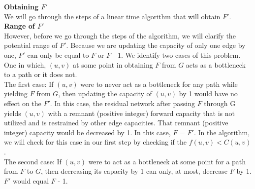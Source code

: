 \documentclass[11pt, solution, letterpaper]{format}
\begin{document}
\textbf{Obtaining $F'$}\\
We will go through the steps of a linear time algorithm that will obtain $F'$. \\

\textbf{Range of $F'$}\\
However, before we go through the steps of the algorithm, we will clarify the potential range of $F'$. Because we are updating the capacity of only one edge by one, $F'$ can only be equal to $F$ or $F$ - 1. We identify two cases of this problem. One in which, $(u, v)$ at some point in obtaining $F$ from $G$ acts as a bottleneck to a path or it does not. \\

The first case: If $(u, v)$ were to never act as a bottleneck for any path while yielding $F$ from $G$, then updating the capacity of $(u, v)$ by 1 would have no effect on the $F'$. In this case, the residual network after passing $F$ through G yields $(u, v)$ with a remnant (positive integer) forward capacity that is not utilized and is restrained by other edge capacities. That remnant (positive integer) capacity would be decreased by 1. In this case, $F$ = $F'$. In the algorithm, we will check for this case in our first step by checking if the $f(u, v) < C(u, v)$.  \\

The second case: If $(u, v)$ were to act as a bottleneck at some point for a path from $F$ to $G$, then decreasing its capacity by 1 can only, at most, decrease $F$ by 1. $F'$ would equal $F$ - 1.\\

\end{document}

